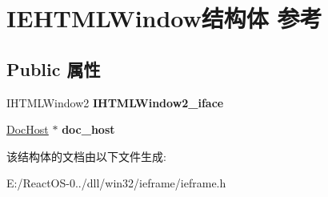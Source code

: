 \hypertarget{struct_i_e_h_t_m_l_window}{}\section{I\+E\+H\+T\+M\+L\+Window结构体 参考}
\label{struct_i_e_h_t_m_l_window}
\subsection*{Public 属性}
\begin{DoxyCompactItemize}
\item 
\mbox{\label{struct_i_e_h_t_m_l_window_ab62ba0ac7b939fec8915cad1178d29d1}} 
I\+H\+T\+M\+L\+Window2 {\bfseries I\+H\+T\+M\+L\+Window2\+\_\+iface}
\item 
\mbox{\label{struct_i_e_h_t_m_l_window_a8afa048021fbed9a203291dfac90ab19}} 
\hyperlink{struct_doc_host}{Doc\+Host} $\ast$ {\bfseries doc\+\_\+host}
\end{DoxyCompactItemize}


该结构体的文档由以下文件生成\+:\begin{DoxyCompactItemize}
\item 
E\+:/\+React\+O\+S-\/0../dll/win32/ieframe/ieframe.\+h\end{DoxyCompactItemize}
